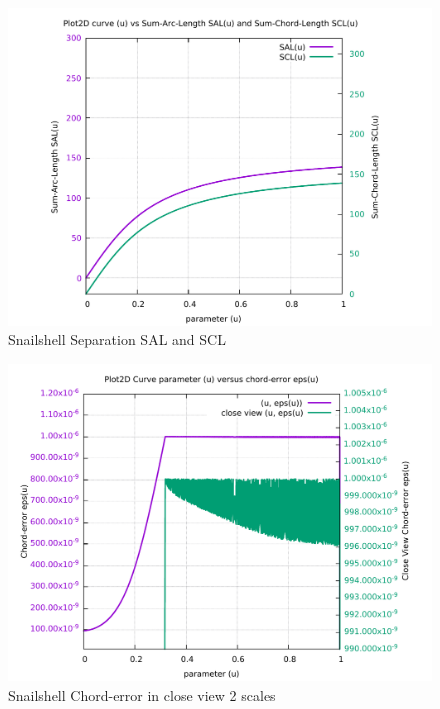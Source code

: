 \begin{figure}
	\caption     {Snailshell Separation SAL and SCL}
	\label{08-img-Snailshell-Separation-SAL-and-SCL.pdf}
	\includegraphics[width=1.00\textwidth]{Chap4/appendix/app-Snailshell/plots/08-img-Snailshell-Separation-SAL-and-SCL.pdf}
\end{figure}

\clearpage
\pagebreak

\begin{figure}
	\caption     {Snailshell Chord-error in close view 2 scales}
	\label{09-img-Snailshell-Chord-error-in-close-view-2-scales.pdf}
	\includegraphics[width=1.00\textwidth]{Chap4/appendix/app-Snailshell/plots/09-img-Snailshell-Chord-error-in-close-view-2-scales.pdf}
\end{figure}

